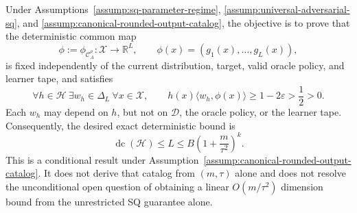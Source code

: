 Under Assumptions~\ref{assump:sq-parameter-regime},
\ref{assump:universal-adversarial-sq}, and
\ref{assump:canonical-rounded-output-catalog}, the objective is to prove that
the deterministic common map
\[
\phi:=\phi_{\mathcal C_A^{\rho}}:\mathcal X\to\mathbb R^L,
\qquad
\phi(x)=(g_1(x),\ldots,g_L(x)),
\]
is fixed independently of the current distribution, target, valid oracle
policy, and learner tape, and satisfies
\begin{equation}
\forall h\in\mathcal H\ \exists w_h\in\Delta_L\ \forall x\in\mathcal X,
\qquad
h(x)\langle w_h,\phi(x)\rangle
\ge1-2\varepsilon>\frac12>0.
\label{eq:formalized-margin-goal}
\end{equation}
Each \(w_h\) may depend on \(h\), but not on \(\mathcal D\), the oracle
policy, or the learner tape.  Consequently, the desired exact deterministic
bound is
\begin{equation}
\operatorname{dc}(\mathcal H)
\le L
\le B\left(1+\frac{m}{\tau^2}\right)^k.
\label{eq:formalized-dimension-goal}
\end{equation}
This is a conditional result under
Assumption~\ref{assump:canonical-rounded-output-catalog}.  It does not derive
that catalog from \((m,\tau)\) alone and does not resolve the unconditional
open question of obtaining a linear \(O(m/\tau^2)\) dimension bound from the
unrestricted SQ guarantee alone.
